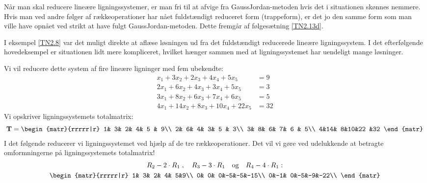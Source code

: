 \begin{aha}
Når man skal reducere lineære ligningssystemer, er man fri til at afvige fra GaussJordan-metoden hvis det i situationen skønnes nemmere. Hvis man ved andre følger af rækkeoperationer har nået fuldstændigt reduceret form (trappeform), er det jo den samme form som man ville have opnået ved strikt at have fulgt GaussJordan-metoden. Dette fremgår af følgesætning \ref{TN2.13d}.
\end{aha}

I eksempel \ref{TN2.8} var det muligt direkte at aflæse løsningen ud fra det fuldstændigt reducerede lineære ligningssystem. I det efterfølgende hovedeksempel er situationen lidt mere kompliceret, hvilket hænger sammen med at ligningssystemet har uendeligt mange løsninger.

\begin{example}\label{TN2.9}
Vi vil reducere dette system af fire lineære ligninger med fem ubekendte:
\begin{equation}
\begin{aligned}
x_1+3x_2+2x_3+4x_4+5x_5&=9\\
2x_1+6x_2+4x_3+3x_4+5x_5&=3\\
3x_1+8x_2+6x_3+7x_4+6x_5&=5\\
4x_1+14x_2+8x_3+10x_4+22x_5&=32
\end{aligned}
\end{equation}
Vi opskriver ligningssystemets totalmatrix:
\begin{equation}
\mathbf{T}=\begin{matr}{rrrrr|r}
 1& 3& 2& 4& 5 & 9\\
 2& 6& 4& 3& 5 & 3\\
 3& 8& 6& 7& 6 & 5\\
 4&14& 8&10&22 &32
\end{matr}
\end{equation}
I det følgende reducerer vi ligningssystemet ved hjælp af de tre rækkeoperationer. Det vil vi gøre ved udelukkende at betragte omformningerne på ligningssystemets totalmatrix!
\begin{equation}
\begin{gathered}
R_2-2\cdot R_1 \;, \quad R_3-3\cdot R_1 \quad \mathrm{og} \quad R_4-4\cdot R_1: \\
\begin{matr}{rrrrr|r}
 1& 3& 2& 4& 5&9\\
 0& 0& 0&-5&-5&-15\\
 0&-1& 0&-5&-9&-22\\

\end{matr}
\end{gathered}
\end{equation}
\end{example}
